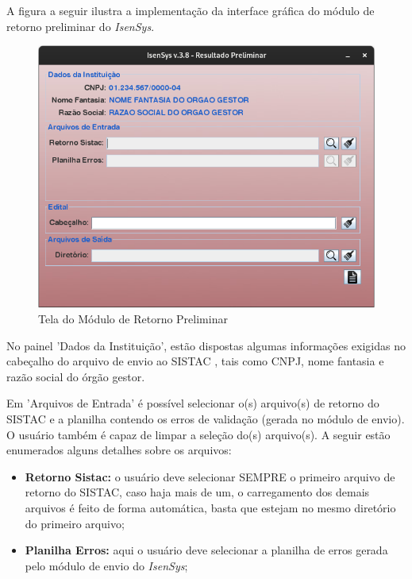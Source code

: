 \documentclass[
	12pt,			%
	openright,		%
	oneside,	
	a4paper,		%
	english,		%
	brazil			%
]{abntex2/abntex2}  %
\begin{document}
					A figura a seguir ilustra a implementação da interface gráfica do módulo de retorno preliminar do \textit{IsenSys}.
	
					\clearpage
					\begin{figure}[ht]
						\begin{center}
							
							\caption{Tela do Módulo de Retorno Preliminar}
							\includegraphics[scale=0.6]{img/retorno-prelim-ui}
							
						\end{center}
					\end{figure}
	
					No painel 'Dados da Instituição', estão dispostas algumas informações exigidas no cabeçalho do arquivo de envio ao SISTAC \cite{sistac-formatos}, tais como CNPJ, nome fantasia e razão social do órgão gestor.
	
					Em 'Arquivos de Entrada' é possível selecionar o(s) arquivo(s) de retorno do SISTAC e a planilha contendo os erros de validação (gerada no módulo de envio). O usuário também é capaz de limpar a seleção do(s) arquivo(s). A seguir estão enumerados alguns detalhes sobre os arquivos:
	
					\begin{itemize}
						
						\item \textbf{Retorno Sistac:} o usuário deve selecionar SEMPRE o primeiro arquivo de retorno do SISTAC, caso haja mais de um, o carregamento dos demais arquivos é feito de forma automática, basta que estejam no mesmo diretório do primeiro arquivo;
						\item \textbf{Planilha Erros:} aqui o usuário deve selecionar a planilha de erros gerada pelo módulo de envio do \textit{IsenSys};
						
					\end{itemize}
		
\end{document}
